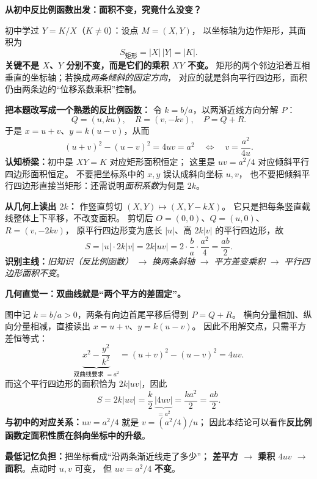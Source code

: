 \clearpage
\begin{explanationbox}
\textbf{从初中反比例函数出发：面积不变，究竟什么没变？}

初中学过 $Y=K/X$（$K\ne0$）：设点 $M=(X,Y)$，
以坐标轴为边作矩形，其面积为
\[
\boxed{S_{\text{矩形}}=|X|\,|Y|=|K|}.
\]
\textbf{关键不是 $X$、$Y$ 分别不变，而是它们的乘积 $XY$ 不变。}
矩形的两个邻边沿着互相垂直的坐标轴；若换成\emph{两条倾斜的固定方向}，
对应的就是斜向平行四边形，面积仍由两条边的“位移系数乘积”控制。

\textbf{把本题改写成一个熟悉的反比例函数：}
令 $k=b/a$，以两渐近线方向分解 $P$：
\[
Q=(u,ku),\quad R=(v,-kv),\quad P=Q+R.
\]
于是 $x=u+v$、$y=k(u-v)$，从而
\[
\boxed{(u+v)^2-(u-v)^2=4uv=a^2}
\quad\Longleftrightarrow\quad
\boxed{v=\frac{a^2}{4u}}.
\]
\textbf{认知桥梁：}初中是 $XY=K$ 对应矩形面积恒定；
这里是 $uv=a^2/4$ 对应倾斜平行四边形面积恒定。
不要把坐标系中的 $x,y$ 误认成斜向坐标 $u,v$，
也不要把倾斜平行四边形直接当矩形：还需说明\emph{面积系数}为何是 $2k$。

\textbf{从几何上读出 $2k$：}
作竖直剪切 $(X,Y)\mapsto(X,Y-kX)$。
它只是把每条竖直截线整体上下平移，不改变面积。
剪切后 $O=(0,0)$、$Q=(u,0)$、$R=(v,-2kv)$，
原平行四边形变为底长 $|u|$、高 $2k|v|$ 的平行四边形，故
\[
S=|u|\cdot2k|v|=2k|uv|
=2\cdot\frac ba\cdot\frac{a^2}{4}
=\boxed{\frac{ab}{2}}.
\]
\textbf{识别主线：}\emph{旧知识（反比例函数）}
$\to$ \emph{换两条斜轴} $\to$ \emph{平方差变乘积}
$\to$ \emph{平行四边形面积不变}。
\end{explanationbox}

\clearpage
\begin{explanationbox}
\textbf{几何直觉一：双曲线就是“两个平方的差固定”。}

\begin{center}

\end{center}

图中记 $k=b/a>0$，两条有向边首尾平移后得到 $P=Q+R$。
横向分量相加、纵向分量相减，直接读出 $x=u+v$、$y=k(u-v)$。
因此不用解交点，只需平方差恒等式：
\[
\underbrace{x^2-\frac{y^2}{k^2}}_{\text{双曲线要求 }=a^2}
=(u+v)^2-(u-v)^2=\boxed{4uv}.
\]
而这个平行四边形的面积恰为 $2k|uv|$，因此
\[
S=2k|uv|=\frac{k}{2}\,\underbrace{|4uv|}_{=a^2}
=\boxed{\frac{ka^2}{2}=\frac{ab}{2}}.
\]
\textbf{与初中的对应关系：}$uv=a^2/4$ 就是 $v=(a^2/4)/u$；
因此本结论可以看作\textbf{反比例函数定面积性质在斜向坐标中的升级}。

\textbf{最低记忆负担：}把坐标看成“沿两条渐近线走了多少”；
\textbf{差平方 $\to$ 乘积 $4uv$ $\to$ 面积}。点动时 $u,v$ 可变，
但 $uv=a^2/4$ \textbf{不变}。
\end{explanationbox}

